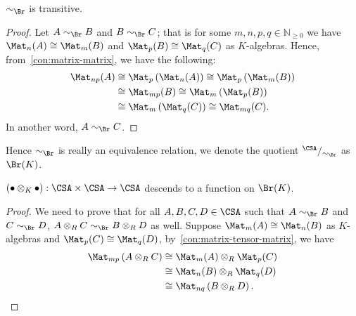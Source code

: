 \begin{lemma}
  $\sim_{\Br}$ is transitive.
  \leanok
\end{lemma}
\begin{proof}
  Let $A\sim_{\Br}B$ and $B\sim_{\Br}C$; that is for some $m,n,p, q\in\mathbb{N}_{\ge0}$ we have $\Mat_{n}(A)\cong\Mat_{m}(B)$ and $\Mat_{p}(B)\cong \Mat_{q}(C)$ as $K$-algebras. Hence, from~\cref{con:matrix-matrix}, we have the following:
  \[
    \begin{aligned}
      \Mat_{np}(A)&\cong \Mat_{p}\left(\Mat_{n}(A)\right)\cong\Mat_{p}\left(\Mat_{m}(B)\right)\\
                  &\cong\Mat_{mp}(B)\cong\Mat_{m}\left(\Mat_{p}(B)\right)\\
      &\cong\Mat_{m}\left(\Mat_{q}(C)\right)\cong\Mat_{mq}(C).
    \end{aligned}
  \]
  In another word, $A\sim_{\Br}C$.
\end{proof}

Hence $\sim_{\Br}$ is really an equivalence relation, we denote the quotient ${}^{\CSA}/_{\sim_{\Br}}$ as $\Br(K)$.

\begin{lemma}\label{lem:br-mul-wd}
  $(\bullet\otimes_{K}\bullet):\CSA\times\CSA \to \CSA$ descends to a function on $\Br(K)$.
  \leanok
\end{lemma}
\begin{proof}
  We need to prove that for all $A, B, C, D \in \CSA$ such that $A\sim_{\Br} B$ and $C\sim_{\Br}D$, $A\otimes_{R}C \sim_{\Br} B\otimes_{R}D$ as well.
  Suppose $\Mat_{m}(A)\cong \Mat_{n}(B)$ as $K$-algebras and $\Mat_{p}(C)\cong\Mat_{q}(D)$, by~\cref{con:matrix-tensor-matrix}, we have
  \[
    \begin{aligned}
      \Mat_{mp}\left(A\otimes_{R} C\right)&\cong \Mat_{m}(A)\otimes_{R}\Mat_{p}(C) \\
                                          &\cong \Mat_{n}(B)\otimes_{R}\Mat_{q}(D)\\
      &\cong \Mat_{nq}\left(B\otimes_{R}D\right).
    \end{aligned}
  \]

\end{proof}

